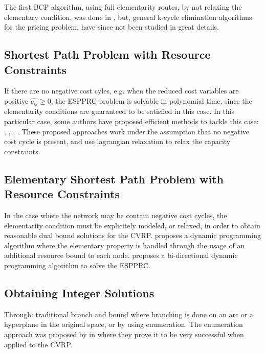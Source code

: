 The first BCP algorithm, using full elementarity routes, by not relaxing the elementary
condition, was done in \cite{chabrier2006},
but, general k-cycle elimination algorithms for the pricing problem, have since not been studied
in great details.

\subsection{Shortest Path Problem with Resource Constraints}
If there are no negative cost cyles, e.g. when the reduced cost variables are positive $\hat{c_{ij}} \ge 0$,
the ESPPRC problem is solvable in polynomial time, since the elementarity conditions are guaranteed
to be satisfied in this case.
In this particular case, some authors have proposed efficient methods to tackle this case:
\cite{beasley1989}, \cite{carlyle2008}, \cite{dumitrescu2003}, \cite{muhandiramge2009}.
These proposed approaches work under the assumption that no negative cost cycle is present,
and use lagrangian relaxation to relax the capacity constraints.


\subsection{Elementary Shortest Path Problem with Resource Constraints}
In the case where the network may be contain negative cost cycles, the
elementarity condition must be explicitely modeled, or relaxed, in order
to obtain reasonable dual bound solutions for the CVRP.
\textcite{feillet2004} proposes a dynamic programming algorithm where
the elementary property is handled through the usage of an additional resource
bound to each node.
\textcite{righini2006} proposes a bi-directional dynamic programming algorithm to solve the ESPPRC.


\subsection{Obtaining Integer Solutions}

Through: traditional branch and bound where branching is done on an arc or a hyperplane in the original space, or by using enumeration.
The enumeration approach was proposed by \textcite{baldacci2008} in where they prove it to be very successful when applied to the CVRP.


\begin{comment}
\cite{jepsen2011}
The other method is enumeration which has proven to be very successful
for both cvrp[1] and vrptw[3]. In enumeration an upper bound U B and
a lower bound LB are used. From reduced cost fixing of a binary variable
it is know that any non basic column with a reduced cost strictly greater
than the gap ub − lb can not be part of an integer solution which is an
improvement of the current solution. This complete set of columns can be
found by solving an espprc using the dominance rule in proposition 5 and
bounding functions. Once we have added the columns with reduced cost less
than or equal to the gap the resulting problem can be solved as an integer
optimization problem.
\end{comment}


